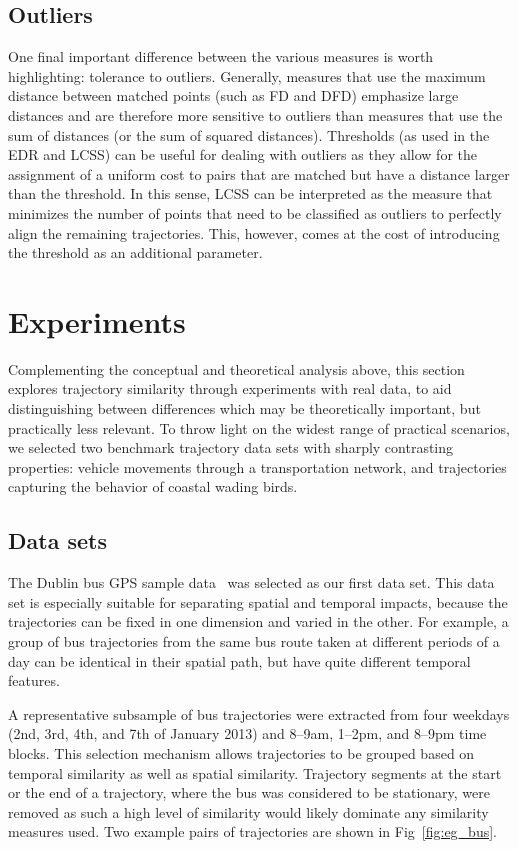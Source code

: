 \documentclass{interact}
\begin{document}
\subsection{Outliers}

One final important difference between the various measures is worth highlighting: tolerance to outliers. Generally, measures that use the maximum distance between matched points (such as FD and DFD) emphasize large distances and are therefore more sensitive to outliers than measures that use the sum of distances (or the sum of squared distances). Thresholds (as used in the EDR and LCSS) can be useful for dealing with outliers as they allow for the assignment of a uniform cost to pairs that are matched but have a distance larger than the threshold. In this sense, LCSS can be interpreted as the measure that minimizes the number of points that need to be classified as outliers to perfectly align the remaining trajectories. This, however, comes at the cost of introducing the threshold as an additional parameter.

	
\section{Experiments}

Complementing the conceptual and theoretical analysis above, this section explores trajectory similarity through experiments with real data, to aid distinguishing between differences which may be theoretically important, but practically less relevant. To throw light on the widest range of practical scenarios, we selected two benchmark trajectory data sets with sharply contrasting properties: vehicle movements through a transportation network, and trajectories capturing the behavior of coastal wading birds.


\subsection{Data sets}
\label{sub:data sets}

The Dublin bus GPS sample data~\citep{DublinBus} was selected as our first data set.  This data set is especially suitable for separating spatial and temporal impacts, because the trajectories can be fixed in one dimension and varied in the other. For example, a group of bus trajectories from the same bus route taken at different periods of a day can be identical in their spatial path, but have quite different temporal features. 

A representative subsample of bus trajectories were extracted from four weekdays (2nd, 3rd, 4th, and 7th of January 2013) and 8--9am, 1--2pm, and 8--9pm time blocks. This selection mechanism allows trajectories to be grouped based on temporal similarity as well as spatial similarity. Trajectory segments at the start or the end of a trajectory, where the bus was considered to be stationary, were removed as such a high level of similarity would likely dominate any similarity measures used. Two example pairs of trajectories are shown in Fig~\ref{fig:eg_bus}.
\end{document}
